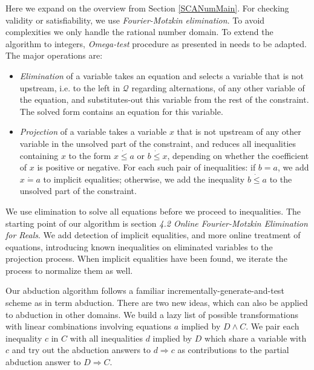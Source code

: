 \documentclass{article}
\newcommand{\tmem}[1]{{\em #1\/}}
\begin{document}
Here we expand on the overview from Section \ref{SCANumMain}. For checking
validity or satisfiability, we use {\tmem{Fourier-Motzkin elimination}}. To
avoid complexities we only handle the rational number domain. To extend the
algorithm to integers, {\tmem{Omega-test}} procedure as presented in
{\cite{ArithQuantElim}} needs to be adapted. The major operations are:
\begin{itemize}
  \item {\tmem{Elimination}} of a variable takes an equation and selects a
  variable that is not upstream, i.e. to the left in $\mathcal{Q}$ regarding
  alternations, of any other variable of the equation, and substitutes-out
  this variable from the rest of the constraint. The solved form contains an
  equation for this variable.
  
  \item {\tmem{Projection}} of a variable takes a variable $x$ that is not
  upstream of any other variable in the unsolved part of the constraint, and
  reduces all inequalities containing $x$ to the form $x \dot{\leqslant} a$ or
  $b \dot{\leqslant} x$, depending on whether the coefficient of $x$ is
  positive or negative. For each such pair of inequalities: if $b = a$, we add
  $x \dot{=} a$ to implicit equalities; otherwise, we add the inequality $b
  \dot{\leqslant} a$ to the unsolved part of the constraint.
\end{itemize}
We use elimination to solve all equations before we proceed to inequalities.
The starting point of our algorithm is {\cite{ArithQuantElim}} section
{\tmem{4.2 Online Fourier-Motzkin Elimination for Reals}}. We add detection of
implicit equalities, and more online treatment of equations, introducing known
inequalities on eliminated variables to the projection process. When implicit
equalities have been found, we iterate the process to normalize them as well.

Our abduction algorithm follows a familiar incrementally-generate-and-test
scheme as in term abduction. There are two new ideas, which can also be
applied to abduction in other domains. We build a lazy list of possible
transformations with linear combinations involving equations $a$ implied by $D
\wedge C$. We pair each inequality $c$ in $C$ with all inequalities $d$
implied by $D$ which share a variable with $c$ and try out the abduction
answers to $d \Rightarrow c$ as contributions to the partial abduction answer
to $D \Rightarrow C$.
\end{document}

